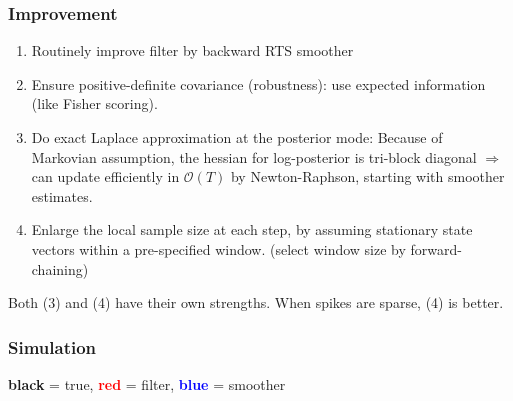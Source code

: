 \documentclass{beamer}
\begin{document}
	
	\begin{frame}
		\frametitle{Improvement}
		\begin{enumerate}
			\item
			Routinely improve filter by backward RTS smoother
			\item
			Ensure positive-definite covariance (robustness): use expected information (like Fisher scoring).
			\item
			Do exact Laplace approximation at the posterior mode: Because of Markovian assumption, the hessian for log-posterior is tri-block diagonal $\Rightarrow$ can update efficiently in $\mathcal{O}(T)$ by Newton-Raphson, starting with smoother estimates.
			\item
			Enlarge the local sample size at each step, by assuming stationary state vectors within a pre-specified window. (select window size by forward-chaining)
		\end{enumerate}
		Both (3) and (4) have their own strengths. When spikes are sparse, (4) is better.
	\end{frame}
	
	\begin{frame}
		\frametitle{Simulation}
		\begin{figure}
		\end{figure}
	\centerline{\textbf{black} = true, \textbf{\textcolor{red}{red}} = filter, \textbf{\textcolor{blue}{blue}} = smoother}
	\end{frame}
	
\end{document}

